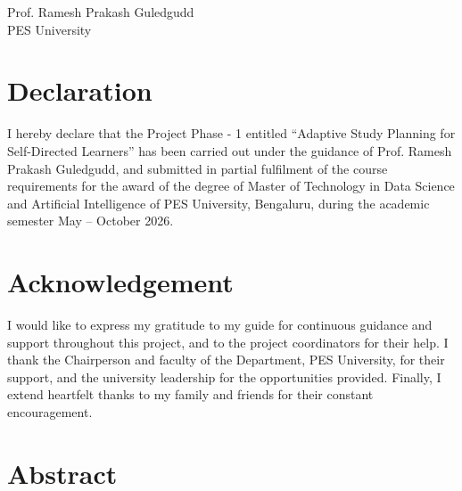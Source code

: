 \documentclass[12pt]{report}
\begin{document}
\vspace{2cm}

\begin{flushright}
Prof. Ramesh Prakash Guledgudd\\
PES University
\end{flushright}

\newpage

\section*{Declaration}

I hereby declare that the Project Phase - 1 entitled ``Adaptive Study Planning for Self-Directed Learners'' has been carried out under the guidance of Prof. Ramesh Prakash Guledgudd, and submitted in partial fulfilment of the course requirements for the award of the degree of Master of Technology in Data Science and Artificial Intelligence of PES University, Bengaluru, during the academic semester May -- October 2026.

\newpage

\section*{Acknowledgement}

I would like to express my gratitude to my guide for continuous guidance and support throughout this project, and to the project coordinators for their help. I thank the Chairperson and faculty of the Department, PES University, for their support, and the university leadership for the opportunities provided. Finally, I extend heartfelt thanks to my family and friends for their constant encouragement.

\newpage

\section*{Abstract}
\end{document}
